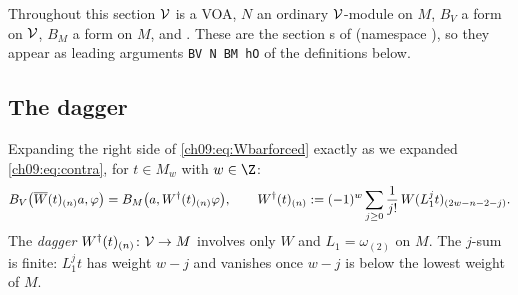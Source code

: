 Throughout this section $\mathcal{V}$ is a VOA, $N$ an ordinary $\mathcal{V}$-module on $M$, $B_V$ a form on
$\mathcal{V}$, $B_M$ a form on $M$, and . These are the section
s of  (namespace ),
so they appear as leading arguments \texttt{BV N BM hO} of the definitions below.

\subsection{The dagger}

Expanding the right side of \eqref{ch09:eq:Wbarforced} exactly as we expanded
\eqref{ch09:eq:contra}, for $t\in M_w$ with $w\in\Z$:
\begin{equation}\label{ch09:eq:dagger}
B_V\big(\overline{W}(t)_{(n)}a,\varphi\big)=B_M\big(a,W^{\dagger}(t)_{(n)}\varphi\big),\qquad
W^{\dagger}(t)_{(n)}:=(-1)^w\sum_{j\ge0}\frac1{j!}\,W(L_1^jt)_{(2w-n-2-j)} .
\end{equation}
The \emph{dagger} $W^{\dagger}(t)_{(n)}\colon\mathcal{V}\to M$ involves only $W$ and $L_1=\omega_{(2)}$ on $M$.
The $j$-sum is finite: $L_1^jt$ has weight $w-j$ and vanishes once $w-j$ is below the lowest weight
of $M$.

